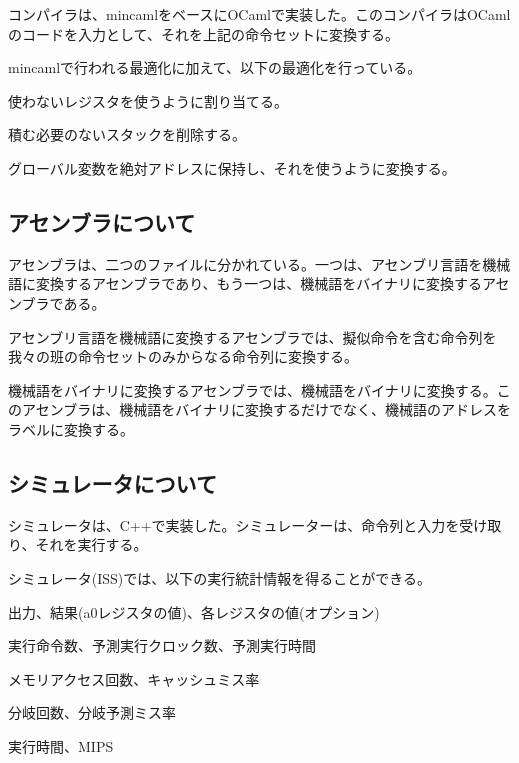 \documentclass[a4paper,11pt]{ltjsarticle}
\begin{document}
コンパイラは、mincamlをベースにOCamlで実装した。このコンパイラはOCamlのコードを入力として、それを上記の命令セットに変換する。

mincamlで行われる最適化に加えて、以下の最適化を行っている。

\begin{description}[labelwidth=10em]
  \item[レジスタ割り当て] 使わないレジスタを使うように割り当てる。
  \item[スタックの最適化] 積む必要のないスタックを削除する。
  \item[グローバル変数の導入] グローバル変数を絶対アドレスに保持し、それを使うように変換する。
\end{description}

\subsection*{アセンブラについて}
アセンブラは、二つのファイルに分かれている。一つは、アセンブリ言語を機械語に変換するアセンブラであり、もう一つは、機械語をバイナリに変換するアセンブラである。

アセンブリ言語を機械語に変換するアセンブラでは、擬似命令を含む命令列を我々の班の命令セットのみからなる命令列に変換する。

機械語をバイナリに変換するアセンブラでは、機械語をバイナリに変換する。このアセンブラは、機械語をバイナリに変換するだけでなく、機械語のアドレスをラベルに変換する。

\subsection*{シミュレータについて}
シミュレータは、C++で実装した。シミュレーターは、命令列と入力を受け取り、それを実行する。

シミュレータ(ISS)では、以下の実行統計情報を得ることができる。

\begin{description}[labelwidth=10em]
  \item[実行結果] 出力、結果(a0レジスタの値)、各レジスタの値(オプション)
  \item[実行時間予測] 実行命令数、予測実行クロック数、予測実行時間
  \item[メモリ性能]  メモリアクセス回数、キャッシュミス率
  \item[分岐予測] 分岐回数、分岐予測ミス率
  \item[ISSの性能] 実行時間、MIPS
\end{description}
\end{document}
